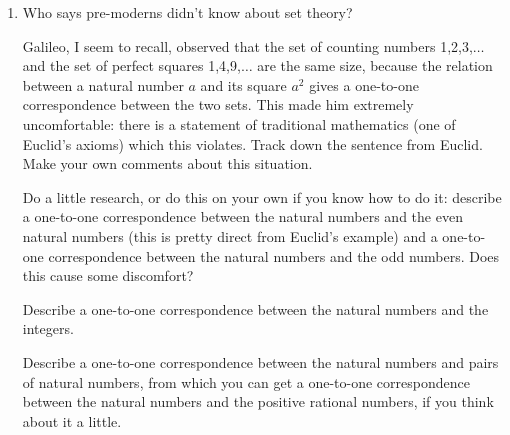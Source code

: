 \documentclass[12pt]{article}
\begin{document}
\begin{enumerate}
\item Who says pre-moderns didn't know about set theory?  

Galileo, I seem to recall, observed that the set of counting numbers 1,2,3,$\ldots$ and the set of perfect squares 1,4,9,$\ldots$ are the same size, because the relation between a natural number $a$ and its square $a^2$  gives a one-to-one correspondence between the two sets.  This made him extremely uncomfortable:  there is a  statement of traditional mathematics (one of Euclid's axioms) which this violates.  Track down the sentence from Euclid. Make your own comments about this situation.

Do a little research, or do this on your own if you know how to do it:  describe a one-to-one correspondence between the natural numbers and the even natural numbers (this is pretty direct from Euclid's example) and a one-to-one correspondence between the natural numbers and the odd numbers.  Does this cause some discomfort?

Describe a one-to-one correspondence between the natural numbers and the integers.

Describe a one-to-one correspondence between the natural numbers and pairs of natural numbers, from which you can get a one-to-one correspondence between the natural numbers
and the positive rational numbers, if you think about it a little.

\end{enumerate}
\end{document}
